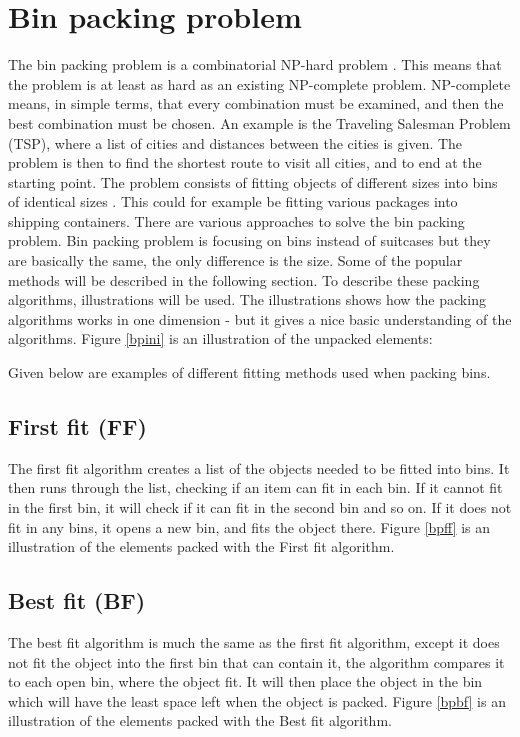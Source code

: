 \section{Bin packing problem}
\label{sec:binpacking}
The bin packing problem is a combinatorial NP-hard problem \citep{combopt}. This means that the problem is at least as hard as an existing NP-complete problem. NP-complete means, in simple terms, that every combination must be examined, and then the best combination must be chosen. An example is the Traveling Salesman Problem (TSP), where a list of cities and distances between the cities is given. The problem is then to find the shortest route to visit all cities, and to end at the starting point. 
The problem consists of fitting objects of different sizes into bins of identical sizes \citep{appofdismath}. This could for example be fitting various packages into shipping containers. There are various approaches to solve the bin packing problem. Bin packing problem is focusing on bins instead of suitcases but they are basically the same, the only difference is the size. Some of the popular methods will be described in the following section. To describe these packing algorithms, illustrations will be used. The illustrations shows how the packing algorithms works in one dimension - but it gives a nice basic understanding of the algorithms. Figure \ref{bpini} is an illustration of the unpacked elements:

Given below are examples of different fitting methods used when packing bins.

\subsection{First fit (FF)}
The first fit algorithm creates a list of the objects needed to be fitted into bins. It then runs through the list, checking if an item can fit in each bin. If it cannot fit in the first bin, it will check if it can fit in the second bin and so on. If it does not fit in any bins, it opens a new bin, and fits the object there. Figure \ref{bpff} is an illustration of the elements packed with the First fit algorithm.

\subsection{Best fit (BF)}
The best fit algorithm is much the same as the first fit algorithm, except it does not fit the object into the first bin that can contain it, the algorithm compares it to each open bin, where the object fit. It will then place the object in the bin which will have the least space left when the object is packed. Figure \ref{bpbf} is an illustration of the elements packed with the Best fit algorithm.

